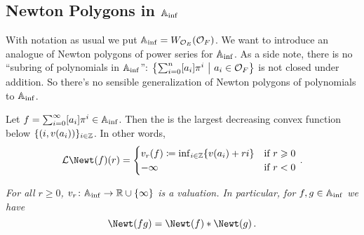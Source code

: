 \documentclass[a4paper, 10pt, oneside, DIV=9, chapterprefix=true, numbers=enddot,bibliography=totoc]{scrbook}
\DeclareRobustCommand{\Attention}{\tikz[baseline, anchor=base]\node[draw, regular polygon, regular polygon sides=3, rounded corners=2, thick, inner sep=-0.25pt] at (0,0) {\textbf{!}};}
\begin{document}
\subsection{Newton Polygons in \texorpdfstring{$\mathbb{A}_{\mathrm{inf}}$}{Ainf}}
With notation as usual we put $\mathbb{A}_{\mathrm{inf}}=W_{\mathcal{O}_E}(\mathcal{O}_F)$. We want to introduce an analogue of Newton polygons of power series for $\mathbb{A}_{\mathrm{inf}}$. As a side note, there is no \enquote{subring of polynomials in $\mathbb{A}_{\mathrm{inf}}$}: $\left\{\sum_{i=0}^n[a_i]\pi^i\ \middle|\  a_i\in\mathcal{O}_F\right\}$ is not closed under addition. So there's no sensible generalization of Newton polygons of polynomials to $\mathbb{A}_{\mathrm{inf}}$.
\begin{defi}\label{def:AinfNewton}
	Let $f=\sum_{i=0}^\infty[a_i]\pi^i\in\mathbb{A}_{\mathrm{inf}}$. Then the  is the largest decreasing convex function below $\{(i,v(a_i))\}_{i\in\mathbb{Z}}$. In other words,
	\begin{equation*}
		\Ll\Newt(f)(r)=\begin{cases}
		v_r(f)\coloneqq\inff_{i\in\IZ}\{v(a_i)+ri\} & \text{if }r\geq 0\\
		-\infty & \text{if }r<0
		\end{cases}\,.
	\end{equation*}
\end{defi}
\numpar{Lemma \smash{\Attention}}\label{lem:vrValuation}\itshape
For all $r\geq 0$, $v_r\colon \IA_\inf\morphism\IR\cup\{\infty\}$ is a valuation. In particular, for $f,g\in\mathbb{A}_{\mathrm{inf}}$ we have
\begin{equation*}
	\Newt(fg)=\Newt(f)*\Newt(g)\,.
\end{equation*}\upshape
\end{document}

